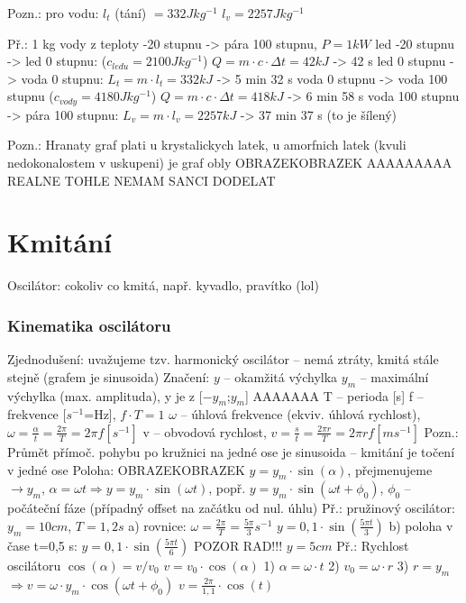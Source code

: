 \documentclass{article}
\begin{document}
Pozn.: pro vodu: $l_t$ (tání) $= 332 Jkg^{-1}$
$l_v = 2257 Jkg^{-1}$

Př.: 1 kg vody z teploty -20 stupnu -> pára 100 stupnu, $P = 1 kW$
led -20 stupnu -> led 0 stupnu: ($c_{ledu} = 2100 Jkg^{-1}$) $Q = m\cdot c\cdot \Delta t = 42 kJ$ -> 42 s
led 0 stupnu -> voda 0 stupnu: $L_t = m\cdot l_t = 332 kJ$ -> 5 min 32 s
voda 0 stupnu -> voda 100 stupnu ($c_{vody} = 4180 Jkg^{-1}$) $Q = m\cdot c \cdot \Delta t = 418 kJ$ -> 6 min 58 s
voda 100 stupnu -> pára 100 stupnu: $L_v = m\cdot l_v = 2257 kJ$ -> 37 min 37 s (to je šílený)

Pozn.: Hranaty graf plati u krystalickych latek, u amorfnich latek (kvuli nedokonalostem v uskupeni) je graf obly OBRAZEKOBRAZEK
AAAAAAAAA REALNE TOHLE NEMAM SANCI DODELAT

\part{Kmitání}
Oscilátor: cokoliv co kmitá, např. kyvadlo, pravítko (lol)

\section{Kinematika oscilátoru}
Zjednodušení: uvažujeme tzv. harmonický oscilátor -- nemá ztráty, kmitá stále stejně (grafem je sinusoida)
Značení: $y$ -- okamžitá výchylka
         $y_m$ -- maximální výchylka (max. amplituda), y je z [$-y_m$;$y_m$] AAAAAAA
         T -- perioda [s]
         f -- frekvence [$s^{-1}$=Hz], $f\cdot T=1$
        $\omega$ -- úhlová frekvence (ekviv. úhlová rychlost), $\omega=\frac{\alpha}{t}=\frac{2\pi}{T}=2\pi f [s^{-1}]$
        v -- obvodová rychlost, $v=\frac{s}{t}=\frac{2\pi r}{T}=2\pi rf [ms^{-1}]$
Pozn.: Průmět přímoč. pohybu po kružnici na jedné ose je sinusoida -- kmitání je točení v jedné ose
Poloha: OBRAZEKOBRAZEK $y=y_m\cdot \sin(\alpha)$, přejmenujeme $\rightarrow y_m$, $\alpha = \omega t \Rightarrow y=y_m\cdot \sin(\omega t)$, popř. $y=y_m\cdot \sin(\omega t+{\phi}_0)$, ${\phi}_0$ -- počáteční fáze (případný offset na začátku od nul. úhlu)
Př.: pružinový oscilátor: $y_m=10cm$, $T=1,2s$
        a) rovnice: $\omega = \frac{2\pi}{T}=\frac{5\pi}{3}s^{-1}$
                    $y=0,1\cdot \sin(\frac{5\pi t}{3})$
        b) poloha v čase t=0,5 s: $y=0,1\cdot \sin(\frac{5\pi t}{6})$ POZOR RAD!!!
                                  $y=5cm$
Př.: Rychlost oscilátoru
     $\cos (\alpha) = v/v_0$
     $v=v_0\cdot \cos (\alpha)$
        1) $\alpha = \omega \cdot t$
        2) $v_0 = \omega \cdot r$
        3) $r = y_m$
     $\Rightarrow v = \omega \cdot y_m \cdot \cos(\omega t + {\phi}_0)$
     $v = \frac{2 \pi}{1,1}\cdot \cos(t)$
\end{document}
